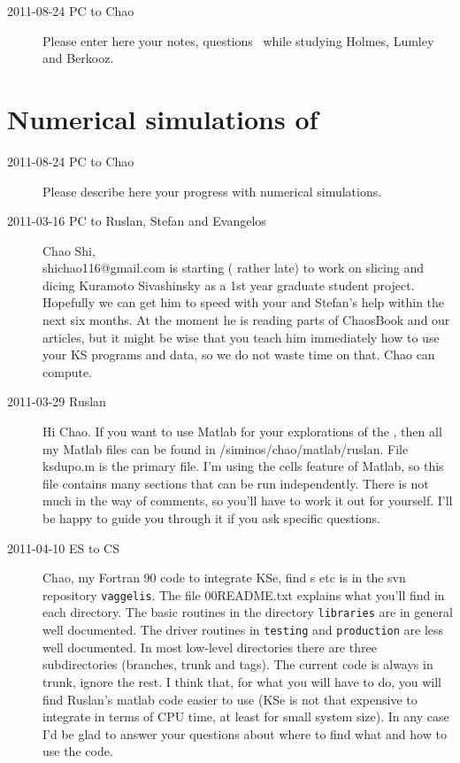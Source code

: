 \begin{description}

\item[2011-08-24 PC to Chao]
Please enter here your notes, questions \etc\ while studying
Holmes, Lumley and Berkooz.

\end{description}

\section{Numerical simulations of \KSe}
\label{s:KSnumerical}

\begin{description}

\item[2011-08-24 PC to Chao]
Please describe here your progress with numerical simulations.

\item[2011-03-16 PC to Ruslan, Stefan and Evangelos]
   Chao Shi,
\\ shichao116@gmail.com is starting ( rather late) to work on
   slicing and dicing Kuramoto Sivashinsky as a 1st year graduate student
   project. Hopefully we can get him to speed with your and Stefan's help
   within the next six months. At the moment he is reading parts of
   ChaosBook and our articles, but it might be wise that you teach him
   immediately how to use your KS programs and data, so we do not waste
   time on that. Chao can compute.

\item[2011-03-29 Ruslan]
Hi Chao.  If you want to use Matlab for your explorations of the \KS,
then all my Matlab files can be found in /siminos/chao/matlab/ruslan.
File ksdupo.m is the primary file.  I'm using the cells feature of
Matlab, so this file contains many sections that can be run
independently.  There is not much in the way of comments, so you'll have
to work it out for yourself.  I'll be happy to guide you through it if
you ask specific questions.

\item[2011-04-10 ES to CS] Chao, my Fortran 90 code to integrate KSe, find
\po s etc is in the svn repository \texttt{vaggelis}. The file 00README.txt
explains what you'll find in each directory. The basic routines in the
directory \texttt{libraries} are in general well documented. The driver routines in
\texttt{testing} and \texttt{production} are less well documented. In most
low-level directories there are three subdirectories (branches, trunk and tags).
The current code is always in trunk, ignore the rest. I think that, for what you
will have to do, you will find Ruslan's matlab code easier to use (KSe is not that
expensive to integrate in terms of CPU time, at least for small system size). In any
case I'd be glad to answer your questions about where to find what and how to
use the code.


\end{description}
